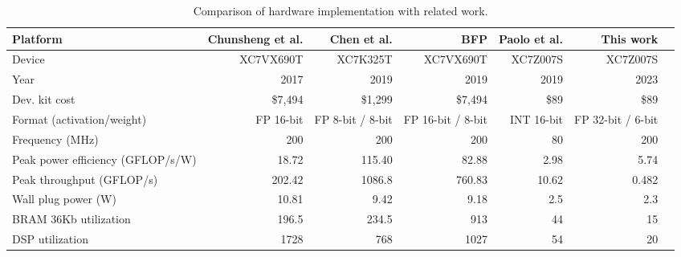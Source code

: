 \begin{table}[!t]\centering
	\caption{Comparison of hardware implementation with related work.}\label{tab:comparison}
	\scriptsize
	\begin{tabular}{lrrrrrr}\toprule
		Platform &Chunsheng et al. \cite{mei2017200mhz} &Chen et al. \cite{wu2021low} &BFP \cite{lian2019high} &Paolo et al. \cite{meloni2019cnn} &This work \\\midrule
		Device &XC7VX690T &XC7K325T &XC7VX690T &XC7Z007S &XC7Z007S \\
		Year &2017 &2019 &2019 &2019 &2023 \\
		Dev. kit cost &\$7,494 &\$1,299 &\$7,494 &\$89 &\$89 \\
		Format (activation/weight) &FP 16-bit &FP 8-bit / 8-bit &FP 16-bit / 8-bit &INT 16-bit &FP 32-bit / 6-bit \\
		Frequency (MHz) &200 &200 &200 &80 &200 \\
		Peak power efficiency (GFLOP/s/W) &18.72 &115.40 &82.88 &2.98 &5.74 \\
		Peak throughput (GFLOP/s) & 202.42 & 1086.8 & 760.83 &  10.62& 0.482\\
		Wall plug power (W) &10.81 &9.42 &9.18 &2.5 &2.3 \\
		BRAM 36Kb utilization &196.5 &234.5 &913 &44 &15 \\
		DSP utilization &1728 &768 &1027 &54 &20 \\
		\bottomrule
	\end{tabular}
\end{table}